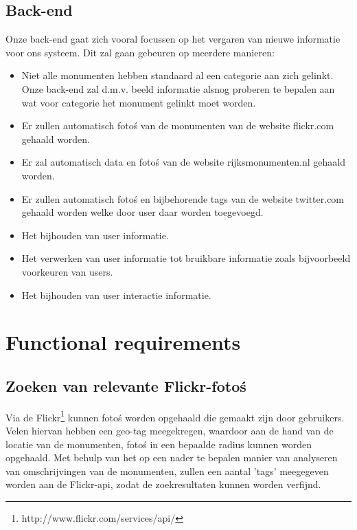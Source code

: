 \documentclass[a4paper,10pt]{article}
\begin{document}
		\subsection{Back-end}
			Onze back-end gaat zich vooral focussen op het vergaren van nieuwe informatie voor ons systeem. Dit zal gaan gebeuren op meerdere manieren:
			\begin{itemize}
				\item Niet alle monumenten hebben standaard al een categorie aan zich gelinkt. Onze back-end zal d.m.v. beeld informatie alsnog proberen te bepalen aan wat voor categorie het monument gelinkt moet worden.
				\item Er zullen automatisch foto\'s van de monumenten van de website flickr.com gehaald worden.
				\item Er zal automatisch data en foto\'s van de website rijksmonumenten.nl gehaald worden.
				\item Er zullen automatisch foto\'s en bijbehorende tags van de website twitter.com gehaald worden welke door user daar worden toegevoegd.
				\item Het bijhouden van user informatie.
				\item Het verwerken van user informatie tot bruikbare informatie zoals bijvoorbeeld voorkeuren van users.
				\item Het bijhouden van user interactie informatie.
			\end{itemize}
			
		\clearpage
		\section{Functional requirements}
			\subsection{Zoeken van relevante Flickr-foto\'s}
			Via de Flickr\footnote{http://www.flickr.com/services/api/} kunnen foto\'s worden opgehaald die gemaakt zijn door gebruikers. Velen hiervan hebben een geo-tag meegekregen, waardoor aan de hand van de locatie van de monumenten, foto\'s in een bepaalde radius kunnen worden opgehaald. Met behulp van het op een nader te bepalen manier van analyseren van omschrijvingen van de monumenten, zullen een aantal 'tags' meegegeven worden aan de Flickr-api, zodat de zoekresultaten kunnen worden verfijnd.
			
\end{document}
